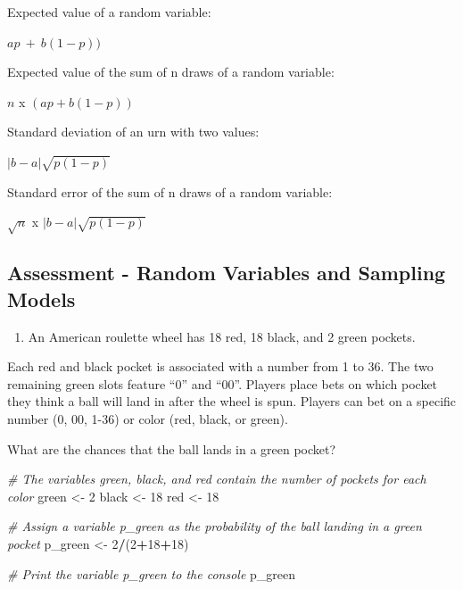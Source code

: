 \documentclass[
]{article}
\newenvironment{Shaded}{\begin{snugshade}}{\end{snugshade}}
\newcommand{\CommentTok}[1]{\textcolor[rgb]{0.56,0.35,0.01}{\textit{#1}}}
\newcommand{\DecValTok}[1]{\textcolor[rgb]{0.00,0.00,0.81}{#1}}
\newcommand{\NormalTok}[1]{#1}
\newcommand{\OperatorTok}[1]{\textcolor[rgb]{0.81,0.36,0.00}{\textbf{#1}}}
\newcommand{\StringTok}[1]{\textcolor[rgb]{0.31,0.60,0.02}{#1}}
\providecommand{\tightlist}{%
  \setlength{\itemsep}{0pt}\setlength{\parskip}{0pt}}
\begin{document}
Expected value of a random variable:

\(ap\:+\:b(1-p))\)

Expected value of the sum of n draws of a random variable:

\(n\) x \((ap + b(1-p))\)

Standard deviation of an urn with two values:

\(|b-a|\sqrt{p(1-p)}\)

Standard error of the sum of n draws of a random variable:

\(\sqrt n\) x \(|b-a|\sqrt{p(1-p)}\)

\hypertarget{assessment---random-variables-and-sampling-models}{%
\subsection{Assessment - Random Variables and Sampling
Models}\label{assessment---random-variables-and-sampling-models}}

\begin{enumerate}
\def\labelenumi{\arabic{enumi}.}
\tightlist
\item
  An American roulette wheel has 18 red, 18 black, and 2 green pockets.
\end{enumerate}

Each red and black pocket is associated with a number from 1 to 36. The
two remaining green slots feature ``0'' and ``00''. Players place bets
on which pocket they think a ball will land in after the wheel is spun.
Players can bet on a specific number (0, 00, 1-36) or color (red, black,
or green).

What are the chances that the ball lands in a green pocket?

\begin{Shaded}
\begin{Highlighting}[]
\CommentTok{\# The variables \textasciigrave{}green\textasciigrave{}, \textasciigrave{}black\textasciigrave{}, and \textasciigrave{}red\textasciigrave{} contain the number of pockets for each color}
\NormalTok{green \textless{}{-}}\StringTok{ }\DecValTok{2}
\NormalTok{black \textless{}{-}}\StringTok{ }\DecValTok{18}
\NormalTok{red \textless{}{-}}\StringTok{ }\DecValTok{18}

\CommentTok{\# Assign a variable \textasciigrave{}p\_green\textasciigrave{} as the probability of the ball landing in a green pocket}
\NormalTok{p\_green \textless{}{-}}\StringTok{ }\DecValTok{2}\OperatorTok{/}\NormalTok{(}\DecValTok{2}\OperatorTok{+}\DecValTok{18}\OperatorTok{+}\DecValTok{18}\NormalTok{)}

\CommentTok{\# Print the variable \textasciigrave{}p\_green\textasciigrave{} to the console}
\NormalTok{p\_green}
\end{Highlighting}
\end{Shaded}
\end{document}
